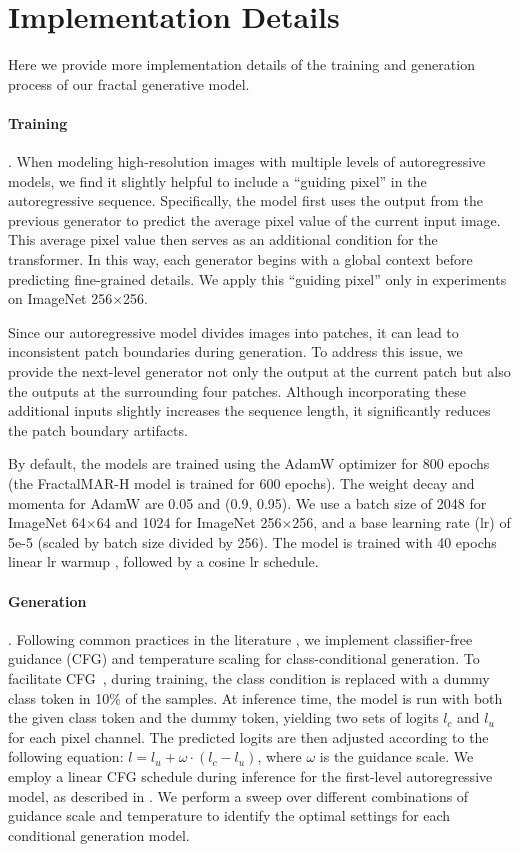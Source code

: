 \section{Implementation Details}
\label{sec:implementation}
Here we provide more implementation details of the training and generation process of our fractal generative model.

\paragraph{Training}. When modeling high-resolution images with multiple levels of autoregressive models, we find it slightly helpful to include a ``guiding pixel'' in the autoregressive sequence. Specifically, the model first uses the output from the previous generator to predict the average pixel value of the current input image. This average pixel value then serves as an additional condition for the transformer. In this way, each generator begins with a global context before predicting fine-grained details. We apply this ``guiding pixel'' only in experiments on ImageNet 256$\times$256.

Since our autoregressive model divides images into patches, it can lead to inconsistent patch boundaries during generation. To address this issue, we provide the next-level generator not only the output at the current patch but also the outputs at the surrounding four patches. Although incorporating these additional inputs slightly increases the sequence length, it significantly reduces the patch boundary artifacts.

By default, the models are trained using the AdamW optimizer \citep{Loshchilov2019} for 800 epochs (the FractalMAR-H model is trained for 600 epochs).
The weight decay and momenta for AdamW are 0.05 and (0.9, 0.95).
We use a batch size of 2048 for ImageNet 64$\times$64 and 1024 for ImageNet 256$\times$256, and a base learning rate (lr) of 5e-5 (scaled by batch size divided by 256).
The model is trained with 40 epochs linear lr warmup \citep{Goyal2017}, followed by a cosine lr schedule.

\paragraph{Generation}. Following common practices in the literature \citep{Chang2022, Chang2023, Li2023}, we implement classifier-free guidance (CFG) and temperature scaling for class-conditional generation. To facilitate CFG~\citep{ho2022classifier}, during training, the class condition is replaced with a dummy class token in 10\% of the samples.
At inference time, the model is run with both the given class token and the dummy token, yielding two sets of logits $l_c$ and $l_u$ for each pixel channel. The predicted logits are then adjusted according to the following equation: $l = l_u + \omega\cdot(l_c - l_u)$, where $\omega$ is the guidance scale. We employ a linear CFG schedule during inference for the first-level autoregressive model, as described in \cite{Chang2023}. We perform a sweep over different combinations of guidance scale and temperature to identify the optimal settings for each conditional generation model.

